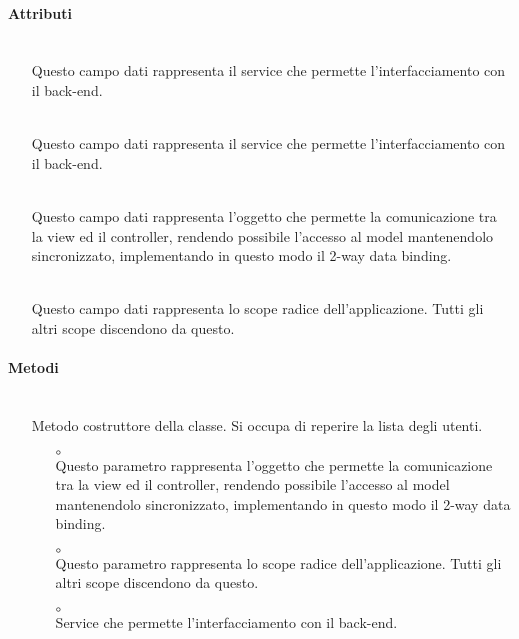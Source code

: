 \paragraph*{Attributi}
\begin{itemize}
\item[]  \\ Questo campo dati rappresenta il service che permette l'interfacciamento con il back-end.
\item[]  \\ Questo campo dati rappresenta il service che permette l'interfacciamento con il back-end.
\item[]  \\ Questo campo dati rappresenta l'oggetto che permette la comunicazione tra la view ed il controller, rendendo possibile l’accesso al model mantenendolo sincronizzato, implementando in questo modo il 2-way data binding.
\item[]  \\ Questo campo dati rappresenta lo scope radice dell'applicazione. Tutti gli altri scope discendono da questo.
\end{itemize}

\paragraph*{Metodi}
\begin{itemize}
\item[]  \\ Metodo costruttore della classe. Si occupa di reperire la lista degli utenti.
\begin{itemize}\addtolength{\itemsep}{-0.5\baselineskip}
\item[$\circ$]  \\ Questo parametro rappresenta l'oggetto che permette la comunicazione tra la view ed il controller, rendendo possibile l’accesso al model mantenendolo sincronizzato, implementando in questo modo il 2-way data binding.
\item[$\circ$]  \\ Questo parametro rappresenta lo scope radice dell'applicazione. Tutti gli altri scope discendono da questo.
\item[$\circ$]  \\ Service che permette l'interfacciamento con il back-end.
\end{itemize}
\end{itemize}

